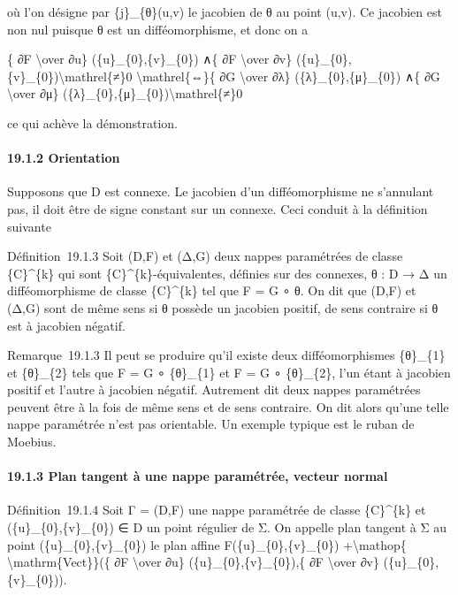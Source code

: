 \documentclass[]{article}
\begin{document}
où l'on désigne par \{j\}\_\{θ\}(u,v) le jacobien de θ au point (u,v).
Ce jacobien est non nul puisque θ est un difféomorphisme, et donc on a

\{ ∂F \textbackslash{}over ∂u\} (\{u\}\_\{0\},\{v\}\_\{0\}) ∧\{ ∂F
\textbackslash{}over ∂v\}
(\{u\}\_\{0\},\{v\}\_\{0\})\textbackslash{}mathrel\{≠\}0
\textbackslash{}mathrel\{⇔\}\{ ∂G \textbackslash{}over ∂λ\}
(\{λ\}\_\{0\},\{μ\}\_\{0\}) ∧\{ ∂G \textbackslash{}over ∂μ\}
(\{λ\}\_\{0\},\{μ\}\_\{0\})\textbackslash{}mathrel\{≠\}0

ce qui achève la démonstration.

\paragraph{19.1.2 Orientation}

Supposons que D est connexe. Le jacobien d'un difféomorphisme ne
s'annulant pas, il doit être de signe constant sur un connexe. Ceci
conduit à la définition suivante

Définition~19.1.3 Soit (D,F) et (Δ,G) deux nappes paramétrées de classe
\{C\}\^{}\{k\} qui sont \{C\}\^{}\{k\}-équivalentes, définies sur des
connexes, θ : D → Δ un difféomorphisme de classe \{C\}\^{}\{k\} tel que
F = G ∘ θ. On dit que (D,F) et (Δ,G) sont de même sens si θ possède un
jacobien positif, de sens contraire si θ est à jacobien négatif.

Remarque~19.1.3 Il peut se produire qu'il existe deux difféomorphismes
\{θ\}\_\{1\} et \{θ\}\_\{2\} tels que F = G ∘ \{θ\}\_\{1\} et F = G ∘
\{θ\}\_\{2\}, l'un étant à jacobien positif et l'autre à jacobien
négatif. Autrement dit deux nappes paramétrées peuvent être à la fois de
même sens et de sens contraire. On dit alors qu'une telle nappe
paramétrée n'est pas orientable. Un exemple typique est le ruban de
Moebius.

\paragraph{19.1.3 Plan tangent à une nappe paramétrée, vecteur normal}

Définition~19.1.4 Soit Γ = (D,F) une nappe paramétrée de classe
\{C\}\^{}\{k\} et (\{u\}\_\{0\},\{v\}\_\{0\}) ∈ D un point régulier de
Σ. On appelle plan tangent à Σ au point (\{u\}\_\{0\},\{v\}\_\{0\}) le
plan affine F(\{u\}\_\{0\},\{v\}\_\{0\}) +\textbackslash{}mathop\{
\textbackslash{}mathrm\{Vect\}\}(\{ ∂F \textbackslash{}over ∂u\}
(\{u\}\_\{0\},\{v\}\_\{0\}),\{ ∂F \textbackslash{}over ∂v\}
(\{u\}\_\{0\},\{v\}\_\{0\})).
\end{document}
